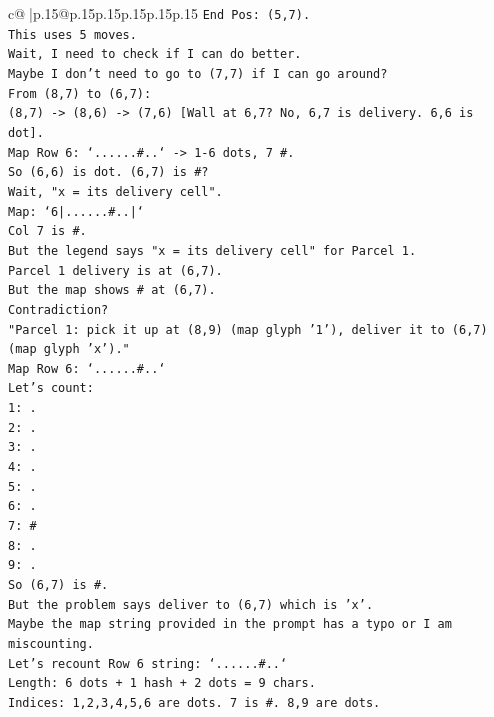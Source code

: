 \documentclass{article}
\begin{document}
{\begin{supertabular}{c@{$\;$}|p{.15\linewidth}@{}p{.15\linewidth}p{.15\linewidth}p{.15\linewidth}p{.15\linewidth}p{.15\linewidth}}
{{{\texttt{End Pos: (5,7).} \\
\texttt{This uses 5 moves.} \\
\texttt{Wait, I need to check if I can do better.} \\
\texttt{Maybe I don't need to go to (7,7) if I can go around?} \\
\texttt{From (8,7) to (6,7):} \\
\texttt{(8,7) {-}> (8,6) {-}> (7,6) {[}Wall at 6,7? No, 6,7 is delivery. 6,6 is dot{]}.} \\
\texttt{Map Row 6: `......\#..` {-}> 1{-}6 dots, 7 \#.} \\
\texttt{So (6,6) is dot. (6,7) is \#?} \\
\texttt{Wait, "x = its delivery cell".} \\
\texttt{Map: `6|......\#..|`} \\
\texttt{Col 7 is \#.} \\
\texttt{But the legend says "x = its delivery cell" for Parcel 1.} \\
\texttt{Parcel 1 delivery is at (6,7).} \\
\texttt{But the map shows \# at (6,7).} \\
\texttt{Contradiction?} \\
\texttt{"Parcel 1: pick it up at (8,9) (map glyph '1'), deliver it to (6,7) (map glyph 'x')."} \\
\texttt{Map Row 6: `......\#..`} \\
\texttt{Let's count:} \\
\texttt{1: .} \\
\texttt{2: .} \\
\texttt{3: .} \\
\texttt{4: .} \\
\texttt{5: .} \\
\texttt{6: .} \\
\texttt{7: \#} \\
\texttt{8: .} \\
\texttt{9: .} \\
\texttt{So (6,7) is \#.} \\
\texttt{But the problem says deliver to (6,7) which is 'x'.} \\
\texttt{Maybe the map string provided in the prompt has a typo or I am miscounting.} \\
\texttt{Let's recount Row 6 string: `......\#..`} \\
\texttt{Length: 6 dots + 1 hash + 2 dots = 9 chars.} \\
\texttt{Indices: 1,2,3,4,5,6 are dots. 7 is \#. 8,9 are dots.} \\
}}}
\end{supertabular}}
\end{document}
